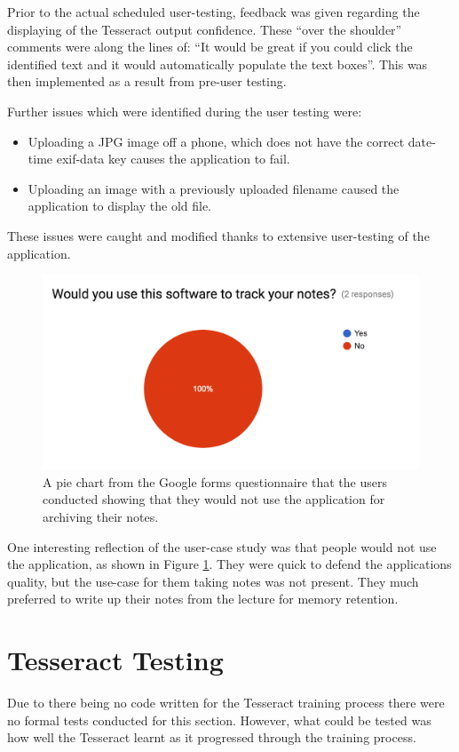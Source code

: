 Prior to the actual scheduled user-testing, feedback was given regarding the displaying of the Tesseract output confidence. These ``over the shoulder'' comments were along the lines of: ``It would be great if you could click the identified text and it would automatically populate the text boxes''. This was then implemented as a result from pre-user testing.

Further issues which were identified during the user testing were:
\begin{itemize}
  \item Uploading a JPG image off a phone, which does not have the correct date-time exif-data key causes the application to fail.
  \item Uploading an image with a previously uploaded filename caused the application to display the old file.
\end{itemize}

These issues were caught and modified thanks to extensive user-testing of the application.

\begin{figure}[h!]
  \centering
  \includegraphics[scale=0.5]{images/user_response}
  \caption{A pie chart from the Google forms questionnaire that the users conducted showing that they would not use the application for archiving their notes.}
  \label{fig:user_response}
\end{figure}

One interesting reflection of the user-case study was that people would not use the application, as shown in Figure \ref{fig:user_response}. They were quick to defend the applications quality, but the use-case for them taking notes was not present. They much preferred to write up their notes from the lecture for memory retention.

\section{Tesseract Testing}
Due to there being no code written for the Tesseract training process there were no formal tests conducted for this section. However, what could be tested was how well the Tesseract learnt as it progressed through the training process.

